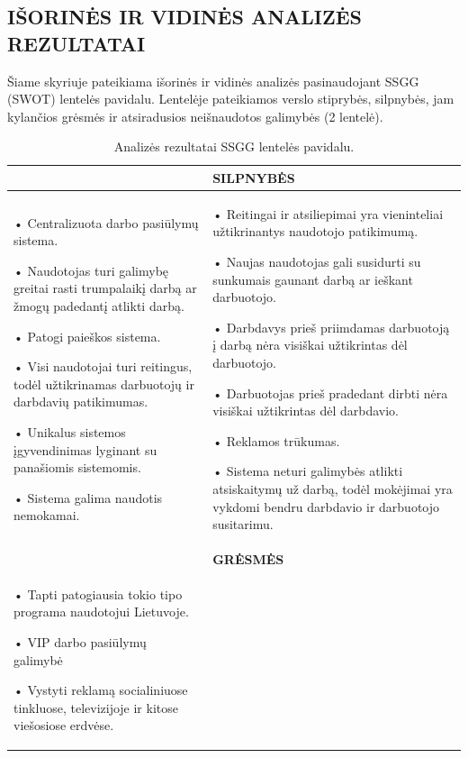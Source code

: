 \documentclass{VUMIFPSkursinis}
\begin{document}
\subsection{IŠORINĖS IR VIDINĖS ANALIZĖS REZULTATAI}
Šiame skyriuje pateikiama išorinės ir vidinės analizės pasinaudojant SSGG (SWOT) lentelės pavidalu. Lentelėje pateikiamos verslo stiprybės, silpnybės, jam kylančios grėsmės ir atsiradusios neišnaudotos galimybės (2 lentelė).
\begin{table}[H]
\caption{Analizės rezultatai SSGG lentelės pavidalu.}
\centering
\normalsize
\begin{tabular}{|p{8cm}|p{8cm}|}
\hline
\rowcolor{gray!40}

\multicolumn{1}{|m{8cm}|}{\textbf{STIPRYBĖS}}&\multicolumn{1}{m{8cm}|}{\textbf{SILPNYBĖS}}\\ \hline
\multicolumn{1}{|m{8cm}|}{
•	Centralizuota darbo pasiūlymų sistema.

•	Naudotojas turi galimybę greitai rasti trumpalaikį darbą ar žmogų padedantį atlikti darbą.

•	Patogi paieškos sistema.

•	Visi naudotojai turi reitingus, todėl užtikrinamas darbuotojų ir darbdavių patikimumas.

•	Unikalus sistemos įgyvendinimas lyginant su panašiomis sistemomis.

•	Sistema galima naudotis nemokamai.}
&\multicolumn{1}{m{8cm}|}{
•	Reitingai ir atsiliepimai yra vieninteliai užtikrinantys naudotojo patikimumą. 

•	Naujas naudotojas gali susidurti su sunkumais gaunant darbą ar ieškant darbuotojo.

•	Darbdavys prieš priimdamas darbuotoją į darbą nėra visiškai užtikrintas dėl darbuotojo.

•	Darbuotojas prieš pradedant dirbti nėra visiškai užtikrintas dėl darbdavio.

•	Reklamos trūkumas.

•	Sistema neturi galimybės atlikti atsiskaitymų už darbą, todėl mokėjimai yra vykdomi bendru darbdavio ir darbuotojo susitarimu.
}\\ \hline
\rowcolor{gray!40}
\multicolumn{1}{|m{8cm}|}{\textbf{GALIMYBĖS}}&\multicolumn{1}{m{8cm}|}{\textbf{GRĖSMĖS}}\\ \hline
\multicolumn{1}{|m{8cm}|}{
•	Tapti patogiausia tokio tipo programa naudotojui  Lietuvoje.

•	VIP darbo pasiūlymų galimybė

•	Vystyti reklamą socialiniuose tinkluose, televizijoje ir kitose viešosiose erdvėse.

}
\end{tabular}
\end{table}
\end{document}
